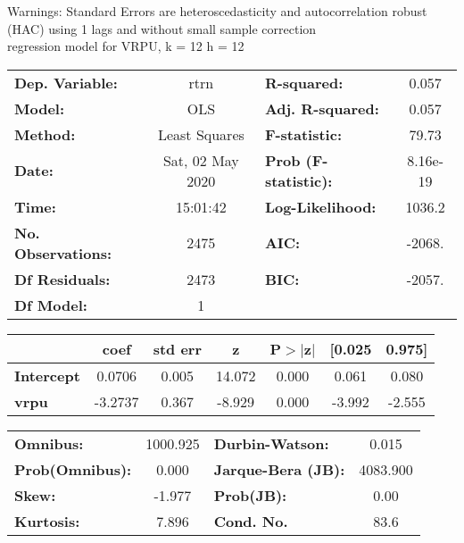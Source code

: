 Warnings: \newline
 [1] Standard Errors are heteroscedasticity and autocorrelation robust (HAC) using 1 lags and without small sample correction\\ 

regression model for VRPU, k = 12 h = 12\begin{center}
\begin{tabular}{lclc}
\toprule
\textbf{Dep. Variable:}    &       rtrn       & \textbf{  R-squared:         } &     0.057   \\
\textbf{Model:}            &       OLS        & \textbf{  Adj. R-squared:    } &     0.057   \\
\textbf{Method:}           &  Least Squares   & \textbf{  F-statistic:       } &     79.73   \\
\textbf{Date:}             & Sat, 02 May 2020 & \textbf{  Prob (F-statistic):} &  8.16e-19   \\
\textbf{Time:}             &     15:01:42     & \textbf{  Log-Likelihood:    } &    1036.2   \\
\textbf{No. Observations:} &        2475      & \textbf{  AIC:               } &    -2068.   \\
\textbf{Df Residuals:}     &        2473      & \textbf{  BIC:               } &    -2057.   \\
\textbf{Df Model:}         &           1      & \textbf{                     } &             \\
\bottomrule
\end{tabular}
\begin{tabular}{lcccccc}
                   & \textbf{coef} & \textbf{std err} & \textbf{z} & \textbf{P$> |$z$|$} & \textbf{[0.025} & \textbf{0.975]}  \\
\midrule
\textbf{Intercept} &       0.0706  &        0.005     &    14.072  &         0.000        &        0.061    &        0.080     \\
\textbf{vrpu}      &      -3.2737  &        0.367     &    -8.929  &         0.000        &       -3.992    &       -2.555     \\
\bottomrule
\end{tabular}
\begin{tabular}{lclc}
\textbf{Omnibus:}       & 1000.925 & \textbf{  Durbin-Watson:     } &    0.015  \\
\textbf{Prob(Omnibus):} &   0.000  & \textbf{  Jarque-Bera (JB):  } & 4083.900  \\
\textbf{Skew:}          &  -1.977  & \textbf{  Prob(JB):          } &     0.00  \\
\textbf{Kurtosis:}      &   7.896  & \textbf{  Cond. No.          } &     83.6  \\
\bottomrule
\end{tabular}
\end{center}

